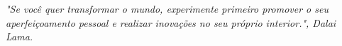 
\renewcommand{\epigraphname}{EPÍGRAFE}

\begin{epigrafe}

\textit{"Se você quer transformar o mundo, experimente primeiro promover o seu aperfeiçoamento pessoal e realizar inovações no seu próprio interior.", Dalai Lama.}

\end{epigrafe}


